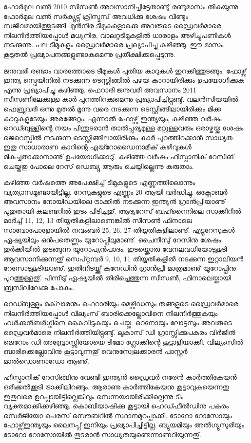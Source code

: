 \vskip 2pt

ഫോര്‍മുല വണ്‍ 2010 സീസണ്‍ അവസാനിച്ചിട്ടേതാണ്ടു് രണ്ടുമാസം തികയുന്നു. ഫോര്‍മുല വണ്‍ സര്‍ക്യൂട്ടു് 
ക്രിസ്മസ് അവധിക്കു ശേഷം വീണ്ടും സജീവമായിത്തുടങ്ങി. മുന്‍നിര ടീമുകളൊക്കെ അവരുടെ ഡ്രൈവര്‍മാരെ 
നിലനിര്‍ത്തിയപ്പോള്‍ മധ്യനിര, വാലറ്റടീമുകളില്‍ ധാരാളം അഴിച്ചുപണികള്‍ നടക്കുന്നു. പല ടീമുകളും ഡ്രൈവര്‍മാരെ 
പ്രഖ്യാപിച്ചു കഴിഞ്ഞു. ഈ മാസം കൂടുതല്‍ പ്രഖ്യാപനങ്ങളുണ്ടാകുമെന്നു പ്രതീക്ഷിക്കപ്പെടുന്നു.

ജനുവരി രണ്ടാം വാരത്തോടെ ടീമുകള്‍ പുതിയ കാറുകള്‍ ഇറക്കിത്തുടങ്ങും. ഫോഴ്സ് ഇന്ത്യ സ്പെയിനില്‍ നടക്കുന്ന 
ടെസ്റ്റിങ്ങില്‍ പഴയ കാറായിരിക്കും ഉപയോഗിക്കുക എന്നു പ്രഖ്യാപിച്ചു കഴിഞ്ഞു. ഫെറാരി ജനുവരി അവസാനം 2011 
സീസണിലേക്കുള്ള കാര്‍ പുറത്തിറക്കുമെന്നു പ്രഖ്യാപിച്ചിട്ടുണ്ടു്. വലന്‍സിയയില്‍ ഫെബ്രുവരി ഒന്നു മുതല്‍ മൂന്നു വരെ 
നടക്കുന്ന ടെസ്റ്റിങ്ങിലായിരിക്കും മിക്ക കാറുകളുടേയും അരങ്ങേറ്റം. എന്നാല്‍ ഫോഴ്സ് ഇന്ത്യയും, കഴിഞ്ഞ വര്‍ഷം 
റെഡ്ബുള്ളിന്റെ നയം പിന്തുടരാന്‍ താല്‍പ്പര്യമുള്ള മറ്റുള്ളവരും ഒരാഴ്ചയ്ക്കു ശേഷം ജെറെസ്സില്‍ നടക്കുന്ന 
ടെസ്റ്റിങ്ങിലായിരിക്കും കാര്‍ പുറത്തിറക്കാന്‍ സാധ്യത. ഇതു സാധാരാണ കാറിന്റെ എയ്റോഡൈനാമിക് കഴിവുകള്‍ 
മികച്ചതാക്കാനാണു് ഉപയോഗിക്കാറു്. കഴിഞ്ഞ വര്‍ഷം ഹിസ്പാനിക് റേസിങ് ചെയ്തതു പോലെ റേസ് ഡെബ്യൂ ആരും 
ചെയ്യില്ലെന്നു കരുതാം.

കഴിഞ്ഞ വര്‍ഷത്തെ അപേക്ഷിച്ച് ടീമുകളുടെ എണ്ണത്തിലൊന്നും വ്യത്യാസമുണ്ടായിട്ടില്ല. റേസുകളുടെ എണ്ണം 20 
ആയി വര്‍ദ്ധിച്ചു. ഒക്റ്റോബര്‍ അവസാനം നോയിഡയിലെ ട്രാക്കില്‍ നടക്കുന്ന ഇന്ത്യന്‍ ഗ്രാന്‍പ്രിയാണു് പുതുതായി 
കലണ്ടറില്‍ ഇടം പിടിച്ചതു്. ആദ്യറേസ് ബഹ്റൈനിലെ സാക്കിറില്‍ മാര്‍ച്ച് 11, 12, 13 തിയ്യതികളിലാണെങ്കില്‍ 
സീസണ്‍ ഫിനാലെ സാവോപോളോയില്‍ നവംബര്‍ 25, 26, 27 തിയ്യതികളിലാണു്. എട്ടുറേസുകള്‍ ഏഷ്യയിലും 
ഒന്‍പതെണ്ണം യൂറോപ്പിലുമാണു്. ചൈനീസു് റേസിനു ശേഷം തുര്‍ക്കിയില്‍ തുടങ്ങുന്ന യൂറോപ്യന്‍പാദം, ഇടയ്ക്കൊരു 
വേനലവധിയോടുകൂടി ആവസാനിക്കുന്നതു് സെപ്റ്റമ്പര്‍ 9, 10, 11 തിയ്യതികളില്‍ നടക്കുന്ന ഇറ്റാലിയന്‍ 
റേസോടുകൂടിയാണു്. ഇതിനിടയ്ക്കു് കനേഡിന്‍ ഗ്രാന്‍പ്രീ മാത്രമാണു് യൂറോപ്പിനു പുറത്തുള്ളതു്. പിന്നീടു് ഏഷ്യയില്‍ 
തിരിച്ചെത്തുന്ന സീസണ്‍, ഫിനാലെയ്ക്കായി ബ്രസീലിലേക്കു പോകും.

റെഡ്ബുള്ളും മക്‌ലാരനും ഫെറാരിയും മെഴ്സിഡസും തങ്ങളുടെ ഡ്രൈവര്‍മാരെ നിലനിര്‍ത്തിയപ്പോള്‍ വില്യംസ് 
ബാരിക്കെല്ലോവിനെ നിലനിര്‍ത്തുകയും ഹള്‍ക്കന്‍ബര്‍ഗ്ഗിനെ കൈവിടുകയും ചെയ്തു. റെനോയും ലോട്ടസും അവരുടെ 
ഡ്രൈവര്‍മാരെ നിലനിര്‍ത്തിയിട്ടുണ്ടു്. ലൂകാസ് ഡി ഗ്രാസ്സിക്കുപകരം വിര്‍ജിന്‍ ജെറോം ഡി അമ്പ്രോസ്സിയോയെ ടിമോ 
ഗ്ലോക്കിന്റെ കൂട്ടാളിയാക്കി. വില്യംസില്‍ ബാരിക്കെല്ലോവിനു കൂട്ടാവുന്നതു് വെനുസ്വേലക്കാരന്‍ പാസ്റ്റര്‍ 
മാല്‍ഡൊണാഡോ ആണു്.

ഹിസ്പാനിക് റേസിങ്ങിനു വേണ്ടി ഇന്ത്യന്‍ ഡ്രൈവര്‍ നരേന്‍ കാര്‍ത്തികേയന്‍ ഒരിക്കല്‍ക്കൂടി ട്രാക്കിലിറങ്ങും. ആരാണു 
കാര്‍ത്തികേയനു കൂട്ടാവുകയെന്നതു ഇതുവരെ ഉറപ്പായിട്ടില്ലെങ്കിലും സെന്നയായിരിക്കില്ലെന്നു ടീം വ്യക്തമാക്കിക്കഴിഞ്ഞു. 
കൊബിയാഷിക്കു കൂട്ടായി ഹെഡ്ഫീല്‍ഡിനു പകരം സെര്‍ജിയോ പെരസ് സൌബറില്‍ സ്ഥാനമുറപ്പാക്കി. ടോറോ
 റോസോയും ഫോഴ്സ്ഇന്ത്യയും ലൈനപ്പ് ഇനിയും പ്രഖ്യാപിച്ചിട്ടില്ല. ബ്യുയമിയും അല്‍ഗ്യുസുരിയും ടോറോ റോസോയില്‍ 
തുടരാന്‍ സാധ്യതയുണ്ടെന്നാണറിയുന്നതു്.

